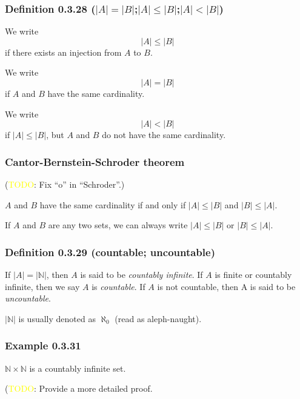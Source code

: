\documentclass[12pt, letterpaper, oneside]{book}
\begin{document}
\subsubsection{Definition 0.3.28 ($|A|=|B|$;$|A| \leq |B|$;$|A|<|B|$)}

We write \[|A| \leq |B|\] if there exists an injection from $A$ to $B$.

We write \[|A| = |B|\] if $A$ and $B$ have the same cardinality.

We write \[|A| < |B|\] if $|A| \leq |B|$, but $A$ and $B$ do not have the same
cardinality.

\subsubsection{Cantor-Bernstein-Schroder theorem}

(\colorbox{red!100}{\textcolor{yellow}{TODO}}: Fix ``o'' in ``Schroder''.)

$A$ and $B$ have the same cardinality if and only if $|A| \leq |B|$ and $|B|
\leq |A|$.

If $A$ and $B$ are any two sets, we can always write $|A| \leq |B|$ or $|B|
\leq |A|$.

\subsubsection{Definition 0.3.29 (countable; uncountable)}

If $|A| = |\mathbb{N}|$, then $A$ is said to be \textit{countably infinite}. If
$A$ is finite or countably infinite, then we say $A$ is \textit{countable}. If
$A$ is not countable, then A is said to be \textit{uncountable}.

$|\mathbb{N}|$ is usually denoted as $\aleph_0$ (read as aleph-naught).

\subsubsection{Example 0.3.31}

$\mathbb{N} \times \mathbb{N}$ is a countably infinite set.

(\colorbox{red!100}{\textcolor{yellow}{TODO}}: Provide a more detailed proof.
\end{document}
